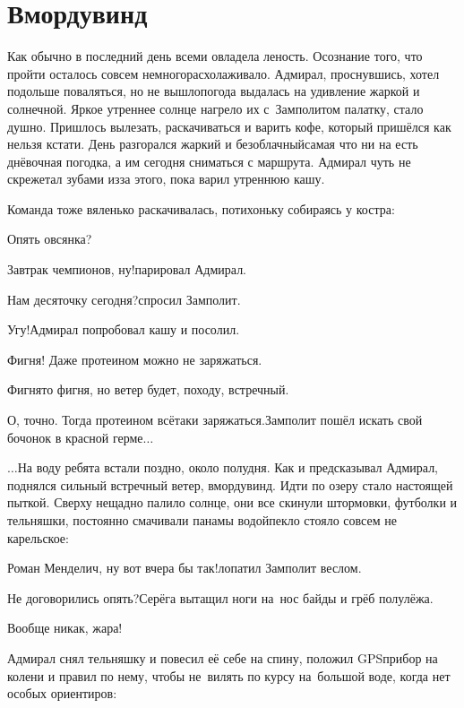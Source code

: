 \chapter{Вмордувинд}
\vepsianrose

Как обычно в последний день всеми овладела леность. Осознание того, что пройти осталось совсем немного\mdash расхолаживало. Адмирал, проснувшись, хотел подольше поваляться, но не вышло\mdash погода выдалась на удивление жаркой и солнечной. Яркое утреннее солнце нагрело их с~Замполитом палатку, стало душно. Пришлось вылезать, раскачиваться и варить кофе, который пришёлся как нельзя кстати. День разгорался жаркий и безоблачный\mdash самая что ни на есть днёвочная погодка, а им сегодня сниматься с маршрута. Адмирал чуть не скрежетал зубами из\sdash за этого, пока варил утреннюю кашу. 

Команда тоже вяленько раскачивалась, потихоньку собираясь у костра:

\diagdash Опять овсянка?

\diagdash Завтрак чемпионов, ну!\mdash парировал Адмирал.

\diagdash Нам десяточку сегодня?\mdash спросил Замполит.

\diagdash Угу!\mdash Адмирал попробовал кашу и посолил.

\diagdash Фигня! Даже протеином можно не заряжаться.

\diagdash Фигня\sdash то фигня, но ветер будет, походу, встречный. 

\diagdash О, точно. Тогда протеином всё\sdash таки заряжаться.\mdash Замполит пошёл искать свой бочонок в красной герме$\ldots$

$\ldots$На воду ребята встали поздно, около полудня. Как и предсказывал Адмирал, поднялся сильный встречный ветер, вмордувинд. Идти по озеру стало настоящей пыткой. Сверху нещадно палило солнце, они все скинули штормовки, футболки и тельняшки, постоянно смачивали панамы водой\mdash пекло стояло совсем не карельское:

\diagdash Роман Менделич, ну вот вчера бы так!\mdash лопатил Замполит веслом.  

\diagdash Не договорились опять?\mdash Серёга вытащил ноги на~нос байды и грёб полулёжа.

\diagdash Вообще никак, жара!

Адмирал снял тельняшку и повесил её себе на спину, положил GPS\sdash прибор на колени и правил по нему, чтобы не~вилять по курсу на~большой воде, когда нет особых ориентиров:

